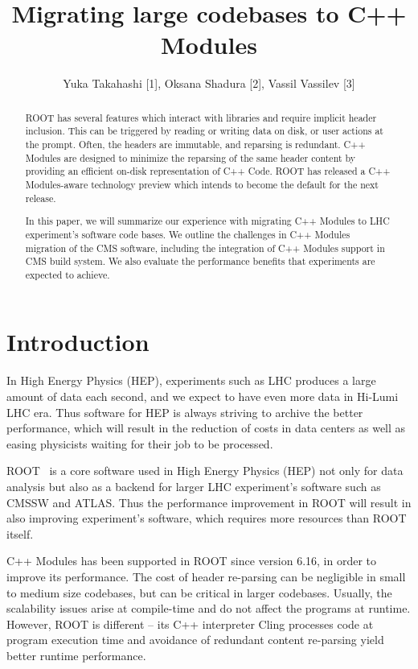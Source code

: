 \documentclass[12pt]{iopart}
\begin{document}
\title{Migrating large codebases to C++ Modules}

\author{Yuka Takahashi [1], Oksana Shadura [2], Vassil Vassilev [3]}
\address{[1] University of Tokyo, [2] University of Nebraska-Lincoln, [3] Princeton University}

\begin{abstract}
ROOT has several features which interact with libraries and require implicit header inclusion. This can be triggered by reading or writing data on disk, or user actions at the prompt. Often, the headers are immutable, and reparsing is redundant. C++ Modules are designed to minimize the reparsing of the same header content by providing an efficient on-disk representation of C++ Code. ROOT has released a C++ Modules-aware technology preview which intends to become the default for the next release.

In this paper, we will summarize our experience with migrating C++ Modules to LHC experiment's software code bases. We outline the challenges in C++ Modules migration of the CMS software, including the integration of C++ Modules support in CMS build system. We also evaluate the performance benefits that experiments are expected to achieve.
\end{abstract}

\section{Introduction}
\label{intro}

In High Energy Physics (HEP), experiments such as LHC \cite{lhc} produces a large amount of data each second, and we expect to have even more data in Hi-Lumi LHC \cite{hilumi} era. Thus software for HEP is always striving to archive the better performance, which will result in the reduction of costs in data centers as well as easing physicists waiting for their job to be processed.

ROOT~\cite{root} is a core software used in High Energy Physics (HEP) not only for data analysis but also as a backend for larger LHC experiment's software such as CMSSW and ATLAS. Thus the performance improvement in ROOT will result in also improving experiment's software, which requires more resources than ROOT itself.

C++ Modules \cite{vassil-paper} has been supported in ROOT since version 6.16, in order to improve its performance. The cost of header re-parsing can be negligible in small to medium size codebases, but can be critical in larger codebases. Usually, the scalability issues arise at compile-time and do not affect the programs at runtime. However, ROOT is different -- its C++ interpreter Cling \cite{cling} processes code at program execution time and avoidance of redundant content re-parsing yield better runtime performance.
\end{document}
